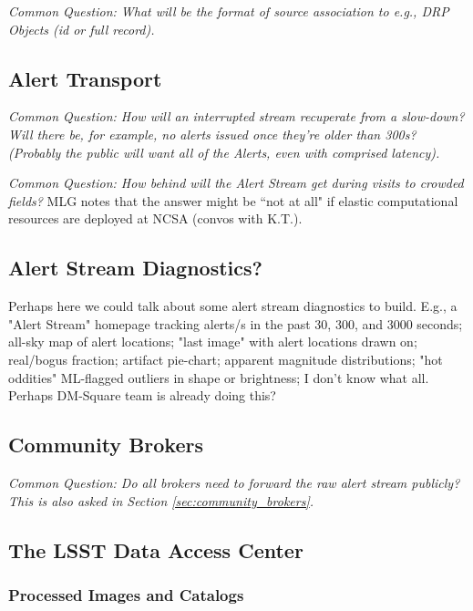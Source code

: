 {\it Common Question: What will be the format of source association to e.g., DRP Objects (id or full record).}



\subsection{Alert Transport}

{\it Common Question: How will an interrupted stream recuperate from a slow-down? Will there be, for example, no alerts issued once they're older than 300s? (Probably the public will want all of the Alerts, even with comprised latency).}

{\it Common Question: How behind will the Alert Stream get during visits to crowded fields?} MLG notes that the answer might be ``not at all" if elastic computational resources are deployed at NCSA (convos with K.T.).


\subsection{Alert Stream Diagnostics?}

Perhaps here we could talk about some alert stream diagnostics to build. E.g., a "Alert Stream" homepage tracking alerts/s in the past 30, 300, and 3000 seconds; all-sky map of alert locations; "last image" with alert locations drawn on; real/bogus fraction; artifact pie-chart; apparent magnitude distributions; "hot oddities" ML-flagged outliers in shape or brightness; I don't know what all. Perhaps DM-Square team is already doing this?


\subsection{Community Brokers}

{\it Common Question: Do all brokers need to forward the raw alert stream publicly? This is also asked in Section \ref{sec:community_brokers}.}


\subsection{The LSST Data Access Center}

\subsubsection{Processed Images and Catalogs}

